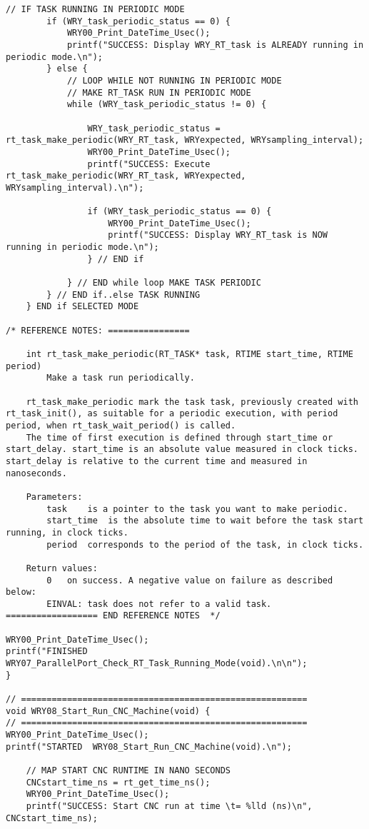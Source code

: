 \begin{lstlisting}[caption={App4-Full C-Code listing for Real Time (RTAI)}, label=App4-Full C-Code listing for Real Time (RTAI)]
		// IF TASK RUNNING IN PERIODIC MODE
		if (WRY_task_periodic_status == 0) {  
			WRY00_Print_DateTime_Usec();
			printf("SUCCESS: Display WRY_RT_task is ALREADY running in periodic mode.\n");
		} else {
			// LOOP WHILE NOT RUNNING IN PERIODIC MODE
			// MAKE RT_TASK RUN IN PERIODIC MODE
			while (WRY_task_periodic_status != 0) {  
	
				WRY_task_periodic_status = rt_task_make_periodic(WRY_RT_task, WRYexpected, WRYsampling_interval);
				WRY00_Print_DateTime_Usec();
				printf("SUCCESS: Execute rt_task_make_periodic(WRY_RT_task, WRYexpected, WRYsampling_interval).\n");

				if (WRY_task_periodic_status == 0) {  
					WRY00_Print_DateTime_Usec();
					printf("SUCCESS: Display WRY_RT_task is NOW running in periodic mode.\n");
				} // END if
				
			} // END while loop MAKE TASK PERIODIC
		} // END if..else TASK RUNNING
	} END if SELECTED MODE

/* REFERENCE NOTES: ================

	int rt_task_make_periodic(RT_TASK* task, RTIME start_time, RTIME period) 
		Make a task run periodically.
	
	rt_task_make_periodic mark the task task, previously created with rt_task_init(), as suitable for a periodic execution, with period period, when rt_task_wait_period() is called.
	The time of first execution is defined through start_time or start_delay. start_time is an absolute value measured in clock ticks. start_delay is relative to the current time and measured in nanoseconds.
	
	Parameters:
		task 	is a pointer to the task you want to make periodic.
		start_time 	is the absolute time to wait before the task start running, in clock ticks.
		period 	corresponds to the period of the task, in clock ticks.

	Return values:
		0 	on success. A negative value on failure as described below:
		EINVAL: task does not refer to a valid task.
================== END REFERENCE NOTES  */

WRY00_Print_DateTime_Usec(); 
printf("FINISHED WRY07_ParallelPort_Check_RT_Task_Running_Mode(void).\n\n");
}

// ========================================================
void WRY08_Start_Run_CNC_Machine(void) {
// ========================================================
WRY00_Print_DateTime_Usec(); 
printf("STARTED  WRY08_Start_Run_CNC_Machine(void).\n");

	// MAP START CNC RUNTIME IN NANO SECONDS
	CNCstart_time_ns = rt_get_time_ns();
	WRY00_Print_DateTime_Usec(); 
	printf("SUCCESS: Start CNC run at time \t= %lld (ns)\n", CNCstart_time_ns);


\end{lstlisting}
